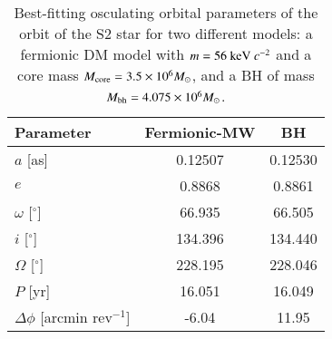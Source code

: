 \documentclass[twocolumn]{aa}
\begin{document}
\begin{table}[t]
\caption{Best-fitting osculating orbital parameters of the orbit of the S2 star for two different models: a fermionic DM model with $m=56~{\rm keV}~c^{-2}$ and a core mass $M_{\rm{core}}=3.5\times 10^6 M_\odot$, and a BH of mass  $M_{\rm bh}=4.075\times 10^6 M_\odot$.}
\centering
\begin{tabular}{lcc}
\hline
Parameter & Fermionic-MW & BH \\
\hline
$a$ [as] & 0.12507 & 0.12530 \\
$e$ & 0.8868 & 0.8861 \\
$\omega$ [$^{\circ}$] & 66.935 & 66.505 \\
$i$ [$^{\circ}$] & 134.396 & 134.440 \\
$\Omega$ [$^{\circ}$] & 228.195 & 228.046 \\
$P$ [yr] & 16.051 & 16.049 \\
$\Delta \phi$ [arcmin rev$^{-1}$] & -6.04 & 11.95 \\
\hline
\end{tabular}
\label{tab:S2}
\end{table}
%
\end{document}
